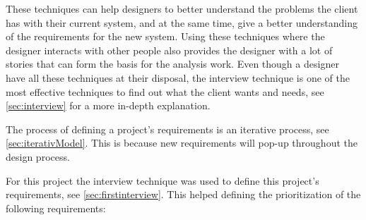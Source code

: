 These techniques can help designers to better understand the problems the client has with their current system, and at the same time, give a better understanding of the requirements for the new system.
Using these techniques where the designer interacts with other people also provides the designer with a lot of stories that can form the basis for the analysis work.
Even though a designer have all these techniques at their disposal, the interview technique
is one of the most effective techniques to find out what the client wants and needs, see \cref{sec:interview} for a more in-depth explanation. 

The process of defining a project's requirements is an iterative process, see \cref{sec:iterativModel}.
This is because new requirements will pop-up throughout the design process.

For this project the interview technique was used to define this project's requirements, see \cref{sec:firstinterview}. This helped defining the prioritization of the following requirements:

